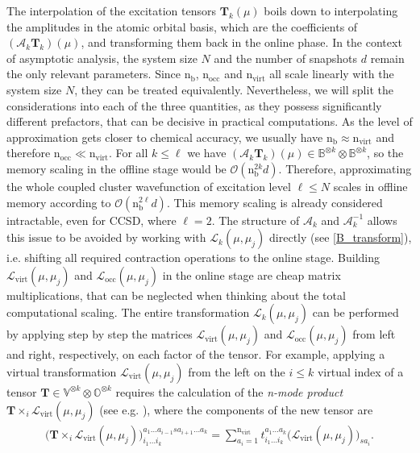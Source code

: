 \documentclass[reqno]{amsart}
\begin{document}
The interpolation of the excitation tensors $\mathbf{T}_k(\mu)$ boils down to interpolating the amplitudes in the atomic orbital basis, which are the coefficients of $(\mathcal{A}_k\mathbf{T}_k)(\mu)$, and transforming them back in the online phase. In the context of asymptotic analysis, the system size $N$ and the number of snapshots $d$ remain the only relevant parameters. Since $\text{n}_{\text{b}}$, $\text{n}_{\text{occ}}$ and $\text{n}_{\text{virt}}$ all scale linearly with the system size $N$, they can be treated equivalently. Nevertheless, we will split the considerations into each of the three quantities, as they possess significantly different prefactors, that can be decisive in practical computations. As the level of approximation gets closer to chemical accuracy, we usually have $\text{n}_{\text{b}} \approx \text{n}_{\text{virt}}$ and therefore $\text{n}_{\text{occ}}\ll \text{n}_{\text{virt}}$. For all $k\le \ell$ we have $(\mathcal{A}_k\mathbf{T}_k)(\mu)\in \mathbb{B}^{\otimes k}\otimes \mathbb{B}^{\otimes k}$, so the memory scaling in the offline stage would be $\mathcal{O}(\text{n}_{\text{b}}^{2k} d)$. Therefore, approximating the whole coupled cluster wavefunction of excitation level $\ell \le N$ scales in offline memory according to $\mathcal{O}(\text{n}_{\text{b}}^{2\ell} d)$. This memory scaling is already considered intractable, even for CCSD, where $\ell=2$. The structure of $\mathcal{A}_k$ and $\mathcal{A}_k^{-1}$ allows this issue to be avoided by working with $\mathscr{L}_k(\mu,\mu_j)$ directly (see \eqref{B_transform}), i.e. shifting all required contraction operations to the online stage. Building $\mathscr{L}_{\text{virt}}(\mu,\mu_j)$ and $\mathscr{L}_{\text{occ}}(\mu,\mu_j)$ in the online stage are cheap matrix multiplications, that can be neglected when thinking about the total computational scaling. The entire transformation $\mathscr{L}_k(\mu,\mu_j)$ can be performed by applying step by step  the matrices $\mathscr{L}_{\text{virt}}(\mu,\mu_j)$ and $\mathscr{L}_{\text{occ}}(\mu,\mu_j)$ from left and right, respectively, on each factor of the tensor. For example, applying a virtual transformation $\mathscr{L}_{\text{virt}}(\mu,\mu_j)$ from the left on the $i\le k$ virtual index of a tensor $\mathbf{T}\in \mathbb{V}^{\otimes k}\otimes \mathbb{O}^{\otimes k}$ requires the calculation of the \textit{n-mode product} $\mathbf{T}\times_i \mathscr{L}_{\text{virt}}(\mu,\mu_j)$ (see e.g. \cite{tensor_ana}), where the components of the new tensor are
\begin{align}\label{n_way_tensor}
    \big(\mathbf{T}\times_i \mathscr{L}_{\text{virt}}(\mu,\mu_j)\big)^{a_1\ldots a_{i-1}s a_{i+1}\ldots a_k}_{i_1\ldots i_k}= \sum^{\text{n}_{\text{virt}}}_{a_i=1}t^{a_1 \ldots a_k}_{i_1\ldots i_k}\big(\mathscr{L}_{\text{virt}}(\mu,\mu_j)\big)_{s a_i}.
\end{align}
\end{document}
